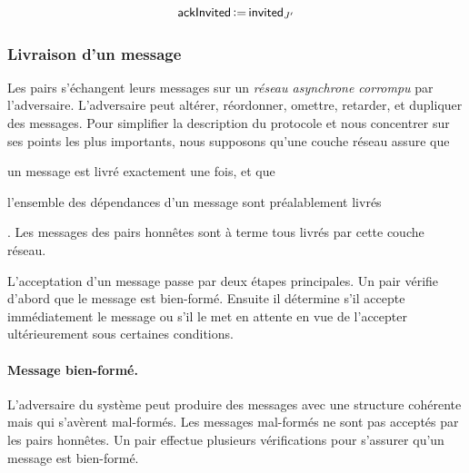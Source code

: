 \begin{equation*}
    \operatorname{\mathsf{ackInvited}} \operatorname{\vcentcolon=} \operatorname{\mathsf{invited}}_{J'}
\end{equation*}


\subsubsection{Livraison d'un message}





Les pairs s'échangent leurs messages sur un \emph{réseau asynchrone corrompu} par l'adversaire.
L'adversaire peut altérer, réordonner, omettre, retarder, et dupliquer des messages.
Pour simplifier la description du protocole et nous concentrer sur ses points les plus importants, nous supposons qu'une couche réseau assure que \begin{inlinelist}\item un message est livré exactement une fois, et que \item l'ensemble des dépendances d'un message sont préalablement livrés\end{inlinelist}.
Les messages des pairs honnêtes sont à terme tous livrés par cette couche réseau.

L'acceptation d'un message passe par deux étapes principales.
Un pair vérifie d'abord que le message est bien-formé.
Ensuite il détermine s'il accepte immédiatement le message ou s'il le met en attente en vue de l'accepter ultérieurement sous certaines conditions.


\paragraph{Message bien-formé.} L'adversaire du système peut produire des messages avec une structure cohérente mais qui s'avèrent mal-formés.
Les messages mal-formés ne sont pas acceptés par les pairs honnêtes.
Un pair effectue plusieurs vérifications pour s'assurer qu'un message est bien-formé.

